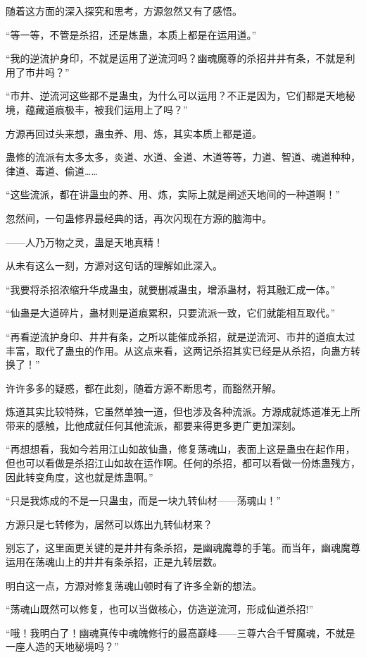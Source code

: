 \begin{this_body}
随着这方面的深入探究和思考，方源忽然又有了感悟。

“等一等，不管是杀招，还是炼蛊，本质上都是在运用道。”

“我的逆流护身印，不就是运用了逆流河吗？幽魂魔尊的杀招井井有条，不就是利用了市井吗？”

“市井、逆流河这些都不是蛊虫，为什么可以运用？不正是因为，它们都是天地秘境，蕴藏道痕极丰，被我们运用上了吗？”

方源再回过头来想，蛊虫养、用、炼，其实本质上都是道。

蛊修的流派有太多太多，炎道、水道、金道、木道等等，力道、智道、魂道种种，律道、毒道、偷道……

“这些流派，都在讲蛊虫的养、用、炼，实际上就是阐述天地间的一种道啊！”

忽然间，一句蛊修界最经典的话，再次闪现在方源的脑海中。

——人乃万物之灵，蛊是天地真精！

从未有这么一刻，方源对这句话的理解如此深入。

“我要将杀招浓缩升华成蛊虫，就要删减蛊虫，增添蛊材，将其融汇成一体。”

“仙蛊是大道碎片，蛊材则是道痕累积，只要流派一致，它们就能相互取代。”

“再看逆流护身印、井井有条，之所以能催成杀招，就是逆流河、市井的道痕太过丰富，取代了蛊虫的作用。从这点来看，这两记杀招其实已经是从杀招，向蛊方转换了！”

许许多多的疑惑，都在此刻，随着方源不断思考，而豁然开解。

炼道其实比较特殊，它虽然单独一道，但也涉及各种流派。方源成就炼道准无上所带来的感触，比他成就任何其他流派，都要来得更多更广更加深刻。

“再想想看，我如今若用江山如故仙蛊，修复荡魂山，表面上这是蛊虫在起作用，但也可以看做是杀招江山如故在运作啊。任何的杀招，都可以看做一份炼蛊残方，因此转变角度，这也就是炼蛊啊。”

“只是我炼成的不是一只蛊虫，而是一块九转仙材——荡魂山！”

方源只是七转修为，居然可以炼出九转仙材来？

别忘了，这里面更关键的是井井有条杀招，是幽魂魔尊的手笔。而当年，幽魂魔尊运用在荡魂山上的井井有条杀招，正是九转层数。

明白这一点，方源对修复荡魂山顿时有了许多全新的想法。

“荡魂山既然可以修复，也可以当做核心，仿造逆流河，形成仙道杀招!”

“哦！我明白了！幽魂真传中魂魄修行的最高巅峰——三尊六合千臂魔魂，不就是一座人造的天地秘境吗？”


\end{this_body}
